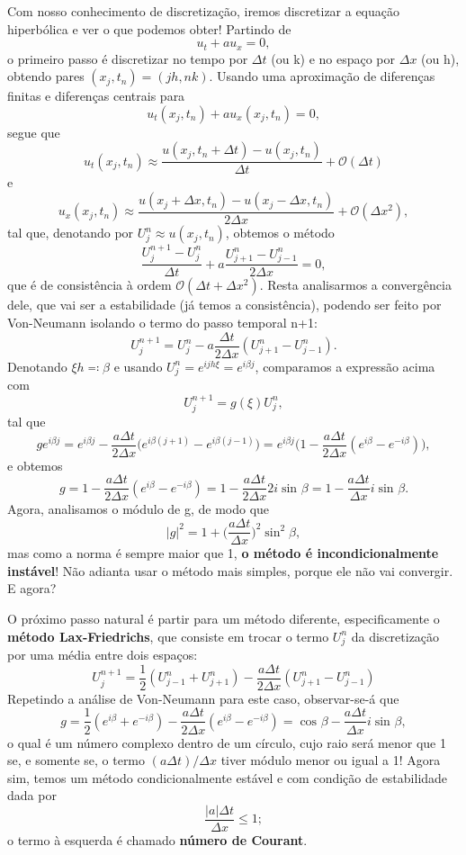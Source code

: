 \documentclass[../differential_methods.tex]{subfiles}
\begin{document}
Com nosso conhecimento de discretização, iremos discretizar a equação hiperbólica e ver o que podemos obter! Partindo de
\[
	u_t + au_x = 0,
\]
o primeiro passo é discretizar no tempo por \(\Delta t\) (ou k) e no espaço por \(\Delta x\) (ou h), obtendo pares \((x_{j}, t_{n}) = (jh, nk)\). Usando uma aproximação de diferenças finitas e diferenças centrais para
\[
	u_t(x_{j}, t_{n}) + a u_x(x_{j}, t_{n}) = 0,
\]
segue que
\[
	u_t(x_{j}, t_{n}) \approx \frac{u(x_{j}, t_{n}+\Delta t) - u(x_{j}, t_{n})}{\Delta t} + \mathcal{O}(\Delta t)
\]
e
\[
	u_x(x_{j}, t_{n})\approx \frac{u(x_{j}+\Delta x, t_{n}) - u(x_{j}-\Delta x, t_{n})}{2\Delta x} + \mathcal{O}(\Delta x^{2}),
\]
tal que, denotando por \(U_{j}^{n}\approx u(x_{j}, t_{n})\), obtemos o método
\[
	\frac{U_{j}^{n+1} - U_{j}^{n}}{\Delta t} + a \frac{U_{j+1}^{n} - U_{j-1}^{n}}{2\Delta x} = 0,
\]
que é de consistência à ordem \(\mathcal{O}(\Delta t + \Delta x^{2})\). Resta analisarmos a convergência dele, que vai ser a estabilidade (já temos a consistência), podendo ser feito por Von-Neumann isolando o termo do passo temporal n+1:
\[
	U_{j}^{n+1} = U_{j}^{n} - a \frac{\Delta t}{2\Delta x}(U_{j+1}^{n} - U_{j-1}^{n}).
\]
Denotando \(\xi h \eqqcolon \beta \) e usando \(U_{j}^{n} = e^{ijh\xi } =e^{i\beta j}\), comparamos a expressão acima com
\[
	U_{j}^{n+1} = g(\xi ) U_{j}^{n},
\]
tal que
\[
	g e^{i\beta j} = e^{i\beta j} - \frac{a\Delta t}{2\Delta x}\biggl(e^{i\beta (j+1)} - e^{i\beta (j-1)}\biggr) = e^{i\beta j}\biggl(1 - \frac{a\Delta t}{2\Delta x}(e^{i\beta }- e^{-i\beta })\biggr),
\]
e obtemos
\[
	g = 1 - \frac{a\Delta t}{2\Delta x}(e^{i\beta } - e^{-i\beta }) = 1- \frac{a\Delta t}{2\Delta x}2i \sin^{}{\beta }=1-\frac{a\Delta t}{\Delta x}i\sin^{}{\beta }.
\]
Agora, analisamos o módulo de g, de modo que
\[
	| g |^{2} = 1 + \biggl(\frac{a\Delta t}{\Delta x}\biggr)^{2} \sin^{2}{\beta },
\]
mas como a norma é sempre maior que 1, \textbf{o método é incondicionalmente instável}! Não adianta usar o método mais simples, porque ele não vai convergir. E agora?

O próximo passo natural é partir para um método diferente, especificamente o \hypertarget{lax_friedrichs}{\textbf{método Lax-Friedrichs}}, que consiste em trocar o termo \(U_{j}^{n}\) da discretização por uma média entre dois espaços:
\[
	\boxed{U_{j}^{n+1} = \frac{1}{2}(U_{j-1}^{n} + U_{j+1}^{n}) - \frac{a\Delta t}{2\Delta x}(U_{j+1}^{n} - U_{j-1}^{n})}
\]
Repetindo a análise de Von-Neumann para este caso, observar-se-á que
\[
	g = \frac{1}{2}(e^{i\beta } + e^{-i\beta }) - \frac{a\Delta t}{2\Delta x}(e^{i\beta } - e^{-i\beta }) = \cos^{}{\beta } - \frac{a\Delta t}{\Delta x}i\sin^{}{\beta },
\]
o qual é um número complexo dentro de um círculo, cujo raio será menor que 1 se, e somente se, o termo \((a\Delta t)/\Delta x\) tiver módulo menor ou igual a 1! Agora sim, temos um método condicionalmente estável e com condição de estabilidade dada por
\[
	\frac{| a |\Delta t}{\Delta x} \leq 1;
\]
o termo à esquerda é chamado \textbf{número de Courant}.
\end{document}
